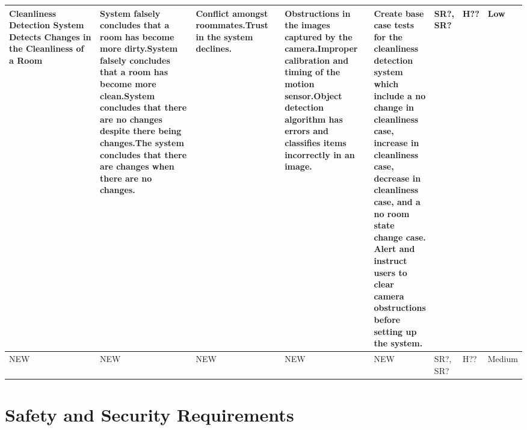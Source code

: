 \documentclass{article}
\begin{document}
\begin{table}[H]
\begin{adjustbox}{width=\textwidth}
\begin{tabular}{|p{0.30\linewidth} | p{0.30\linewidth} | p{0.20\linewidth}|  p{0.20\linewidth}|  p{0.30\linewidth}|  p{0.07\linewidth}|  p{0.07\linewidth}|p{0.12\linewidth}| }
         \hline
         
         \hline
         Cleanliness Detection System Detects Changes in the Cleanliness of a Room & System falsely concludes that a room has become more dirty.\newline\newline System falsely concludes that a room has become more clean.\newline\newline System concludes that there are no changes despite there being changes.\newline\newline The system concludes that there are changes when there are no changes. & Conflict amongst roommates.\newline\newline Trust in the system declines. & Obstructions in the images captured by the camera.\newline\newline Improper calibration and timing of the motion sensor.\newline\newline Object detection algorithm has errors and classifies items incorrectly in an image.& Create base case tests for the cleanliness detection system which include a no change in cleanliness case, increase in cleanliness case, decrease in cleanliness case, and a no room state change case. \newline\newline Alert and instruct users to clear camera obstructions before setting up the system. & SR?, SR? & H?? & Low\\
         \hline
         
         \hline
         NEW & NEW\newline & NEW & NEW & NEW & SR?, SR? & H?? & Medium\\
         \hline
    \end{tabular}
    \end{adjustbox}
    \label{tab:my_label}
\end{table}


\newpage

\section{Safety and Security Requirements}

\end{document}

